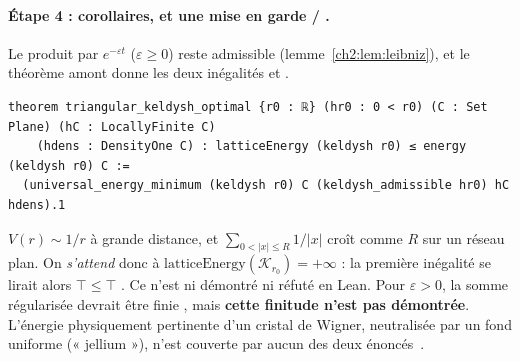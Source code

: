 \paragraph{Étape 4 : corollaires, et une mise en garde \tierA{} / \tierC.} Le produit par $e^{-\varepsilon t}$
($\varepsilon\ge0$) reste admissible (lemme~\ref{ch2:lem:leibniz}), et le théorème amont donne les deux inégalités
 et .
\begin{leanbox}
\begin{lstlisting}[style=chdeux]
theorem triangular_keldysh_optimal {r0 : ℝ} (hr0 : 0 < r0) (C : Set Plane) (hC : LocallyFinite C)
    (hdens : DensityOne C) : latticeEnergy (keldysh r0) ≤ energy (keldysh r0) C :=
  (universal_energy_minimum (keldysh r0) C (keldysh_admissible hr0) hC hdens).1
\end{lstlisting}
\end{leanbox}
\begin{warnbox}[: $\top\le\top$]
$V(r)\sim1/r$ à grande distance, et $\sum_{0<|x|\le R}1/|x|$ croît comme $R$ sur un réseau plan. On \emph{s'attend}
donc à $\mathrm{latticeEnergy}(\mathcal K_{r_0})=+\infty$ : la première inégalité se lirait alors $\top\le\top$
\tierC. Ce n'est ni démontré ni réfuté en Lean. Pour $\varepsilon>0$, la somme régularisée devrait être finie \tierC,
mais \textbf{cette finitude n'est pas démontrée}. L'énergie physiquement pertinente d'un cristal de Wigner, neutralisée
par un fond uniforme (« jellium »), n'est couverte par aucun des deux énoncés~\cite{ch2kel}.
\end{warnbox}

